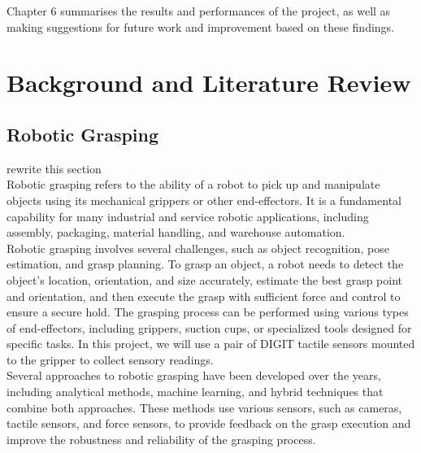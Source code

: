 \documentclass[12pt, a4paper]{report}
\theoremstyle{definition}
\begin{document}
Chapter 6 summarises the results and performances of the project, as well as making suggestions for future work and improvement based on these findings.


\chapter{Background and Literature Review}
\label{chap:2}

\section{Robotic Grasping}
\label{sec:2.1}

{\color{red}rewrite this section}\\

Robotic grasping refers to the ability of a robot to pick up and manipulate objects using its mechanical grippers or other end-effectors. It is a fundamental capability for many industrial and service robotic applications, including assembly, packaging, material handling, and warehouse automation.\\

Robotic grasping involves several challenges, such as object recognition, pose estimation, and grasp planning. To grasp an object, a robot needs to detect the object's location, orientation, and size accurately, estimate the best grasp point and orientation, and then execute the grasp with sufficient force and control to ensure a secure hold. The grasping process can be performed using various types of end-effectors, including grippers, suction cups, or specialized tools designed for specific tasks. In this project, we will use a pair of DIGIT tactile sensors mounted to the gripper to collect sensory readings.\\

Several approaches to robotic grasping have been developed over the years, including analytical methods, machine learning, and hybrid techniques that combine both approaches. These methods use various sensors, such as cameras, tactile sensors, and force sensors, to provide feedback on the grasp execution and improve the robustness and reliability of the grasping process.\\
\end{document}
